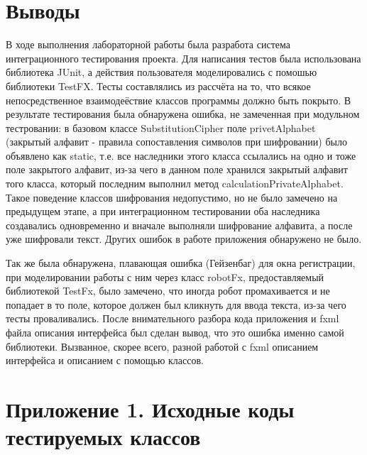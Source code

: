 \documentclass[a4paper,12pt]{article}
\begin{document}
\newpage\section*{Выводы}
В ходе выполнения лабораторной работы была разработа система интеграционного тестирования проекта. Для написания тестов была использована библиотека JUnit, а действия пользователя моделировались с помошью библиотеки TestFX. Тесты составлялись из рассчёта на то, что всякое непосредственное взаимодеёствие классов программы должно быть покрыто. В результате тестирования была обнаружена ошибка, не замеченная при модульном тестровании: в базовом классе SubstitutionCipher поле privetAlphabet (закрытый алфавит - правила сопоставления символов при шифровании) было объявлено как static, т.е. все наследники этого класса ссылались на одно и тоже поле закрытого алфавит, из-за чего в данном поле хранился закрытый алфавит того класса, который последним выполнил метод calculationPrivateAlphabet. Такое поведение классов шифрования недопустимо, но не было замечено на предыдущем этапе, а при интеграционном тестировании оба наследника создавались одновременно и вначале выполняли шифрование алфавита, а после уже шифровали текст. Других ошибок в работе приложения обнаружено не было.
\par Так же была обнаружена, плавающая ошибка (Гейзенбаг) для окна регистрации, при моделировании работы с ним через класс robotFx, предоставляемый библиотекой TestFx, было замечено, что иногда робот промахивается и не попадает в то поле, которое должен был кликнуть для ввода текста, из-за чего тесты проваливались. После внимательного разбора кода приложения и fxml файла описания интерфейса был сделан вывод, что это ошибка именно самой библиотеки. Вызванное, скорее всего, разной работой с fxml описанием интерфейса и описанием с помощью классов. 
\newpage\section*{Приложение 1. Исходные коды тестируемых классов}
\end{document}
